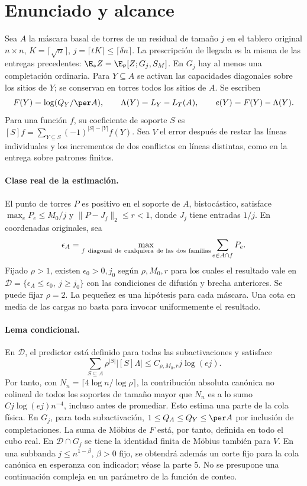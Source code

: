 \section{Enunciado y alcance}
Sea $A$ la máscara basal de torres de un residual de tamaño $j$ en el tablero original
$n\times n$, $K=\lceil\sqrt n\rceil$, $j=\lceil tK\rceil\le\lceil\delta n\rceil$.
La prescripción de llegada es la misma de las entregas precedentes:
$\E_*Z=\E_{\bar\nu}[Z;G_j,S_M]$. En $G_j$ hay al menos una completación ordinaria.
Para $Y\subseteq A$ se activan las capacidades diagonales sobre los sitios de $Y$;
se conservan en torres todos los sitios de $A$. Se escriben
\[
 F(Y)=\log(Q_Y/\per A),\qquad \Lambda(Y)=L_Y-L_T(A),\qquad e(Y)=F(Y)-\Lambda(Y).
\]
Para una función $f$, su coeficiente de soporte $S$ es
$[S]f=\sum_{Y\subseteq S}(-1)^{|S|-|Y|}f(Y)$.
Sea $V$ el error después de restar las líneas individuales y los incrementos de dos
conflictos en líneas distintas, como en la entrega sobre patrones finitos.

\paragraph{Clase real de la estimación.}
El punto de torres $P$ es positivo en el soporte de $A$, bistocástico, satisface
$\max_e P_e\le M_0/j$ y $\|P-J_j\|_2\le r<1$, donde $J_j$ tiene entradas $1/j$.
En coordenadas originales, sea
\[
 \epsilon_A=\max_{f\ {\rm diagonal\ de\ cualquiera\ de\ las\ dos\ familias}}
                  \sum_{e\in A\cap f}P_e .
\]
Fijado $\rho>1$, existen $\epsilon_0>0,j_0$ según $\rho,M_0,r$ para los cuales el
resultado vale en $\mathcal D=\{\epsilon_A\le\epsilon_0,\ j\ge j_0\}$
con las condiciones de difusión y brecha anteriores. Se puede fijar $\rho=2$.
La pequeñez es una hipótesis para cada máscara. Una cota en media de las cargas
no basta para invocar uniformemente el resultado.

\paragraph{Lema condicional.}
En $\mathcal D$, el predictor está definido para todas las subactivaciones y satisface
\[
 \sum_{S\subseteq A}\rho^{|S|}|[S]\Lambda|
       \le C_{\rho,M_0,r} j\log(ej).
\]
Por tanto, con $N_n=\lceil4\log n/\log\rho\rceil$, la contribución absoluta canónica
no colineal de todos los soportes de tamaño mayor que $N_n$ es a lo sumo
$Cj\log(ej)n^{-4}$, incluso antes de promediar. Esto estima una parte de la cola física.
En $G_j$, para toda subactivación, $1\le Q_A\le Q_Y\le\per A$ por inclusión de
completaciones. La suma de Möbius de $F$ está, por tanto, definida en todo el cubo
real. En $\mathcal D\cap G_j$ se tiene la identidad finita de Möbius también para $V$.
En una subbanda $j\le n^{1-\beta}$, $\beta>0$ fijo, se obtendrá además un corte
fijo para la cola canónica en esperanza con indicador; véase la parte 5.
No se presupone una continuación compleja en un parámetro de la función de conteo.
